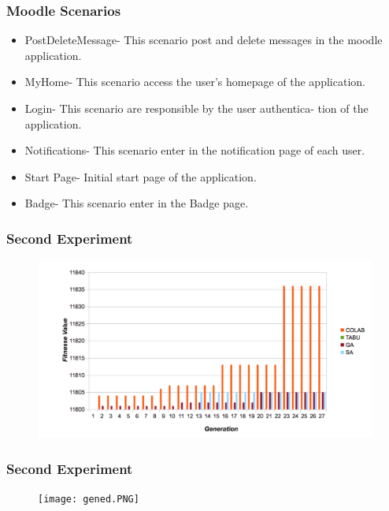 \documentclass{beamer}
\begin{document}
\begin{frame}
\frametitle{Moodle Scenarios}
\begin{itemize}
\item PostDeleteMessage- This scenario post and delete messages in the moodle application.
\item  MyHome- This scenario access the user’s homepage of the application.
\item Login- This scenario are responsible by the user authentica- tion of the application.
\item Notifications- This scenario enter in the notification page of each user.
\item Start Page- Initial start page of the application.
\item Badge- This scenario enter in the Badge page.
\end{itemize}
\end{frame}


\begin{frame}
\frametitle{Second Experiment}
\begin{figure}[H]
\centering
\includegraphics[width=1.2\linewidth]{generationcomparative.PNG}
\end{figure}
\end{frame}

\begin{frame}
\frametitle{Second Experiment}
\begin{figure}[H]
\centering
\texttt{[image: gened.PNG]}
\end{figure}
\end{frame}
\end{document}
